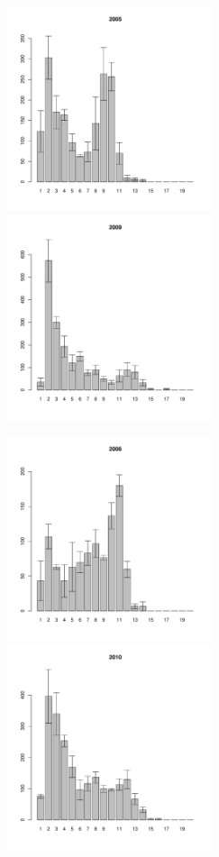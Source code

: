 \documentclass[12pt, a4paper]{article}
\begin{document}
\begin{figure}[h]
\begin{multicols}{3}
\hfill
\includegraphics[width=60mm]{../White_Sea/Estuatiy_Luvenga/sizestr_2005_.pdf}
\hfill
\includegraphics[width=60mm]{../White_Sea/Estuatiy_Luvenga/sizestr_2009_.pdf}
\end{multicols}


\begin{multicols}{3}
\hfill
\includegraphics[width=60mm]{../White_Sea/Estuatiy_Luvenga/sizestr_2006_.pdf}
\hfill
\includegraphics[width=60mm]{../White_Sea/Estuatiy_Luvenga/sizestr_2010_.pdf}
\end{multicols}


\end{figure}
\end{document}
